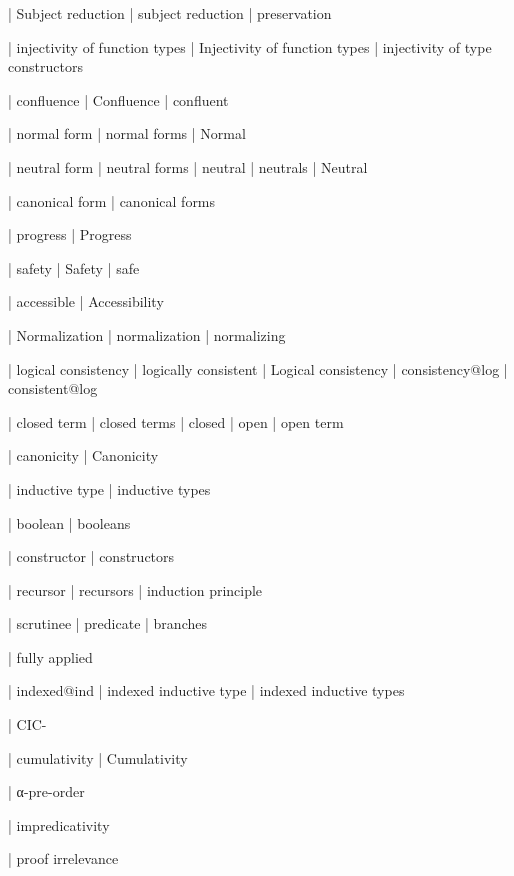   | Subject reduction
  | subject reduction
  | preservation

  | injectivity of function types
  | Injectivity of function types
  | injectivity of type constructors

  | confluence
  | Confluence
  | confluent

  | normal form
  | normal forms
  | Normal

  | neutral form
  | neutral forms
  | neutral
  | neutrals
  | Neutral

  | canonical form
  | canonical forms

  | progress
  | Progress

  | safety
  | Safety
  | safe

  | accessible
  | Accessibility

  | Normalization
  | normalization
  | normalizing

  | logical consistency
  | logically consistent
  | Logical consistency
  | consistency@log
  | consistent@log

  | closed term
  | closed terms
  | closed
  | open
  | open term

  | canonicity
  | Canonicity

  | inductive type
  | inductive types

  | boolean
  | booleans

  | constructor
  | constructors

  | recursor
  | recursors
  | induction principle

  | scrutinee
  | predicate
  | branches

  | fully applied

  | indexed@ind
  | indexed inductive type
  | indexed inductive types

  | CIC-

  | cumulativity
  | Cumulativity

  | α-pre-order

  | impredicativity

  | proof irrelevance

